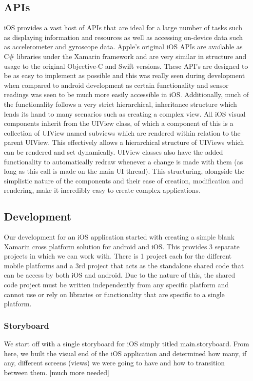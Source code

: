 \documentclass[main.tex]{subfiles}
\begin{document}
\subsection{APIs}
iOS provides a vast host of APIs that are ideal for a large number of tasks such as displaying information and resources as well as accessing on-device data such as accelerometer and gyroscope data. Apple’s original iOS APIs are available as C\# libraries under the Xamarin framework and are very similar in structure and usage to the original Objective-C and Swift versions. These API’s are designed to be as easy to implement as possible and this was really seen during development when compared to android development as certain functionality and sensor readings was seen to be much more easily accessible in iOS. Additionally, much of the functionality follows a very strict hierarchical, inheritance structure which lends its hand to many scenarios such as creating a complex view. All iOS visual components inherit from the UIView class, of which a component of this is a collection of UIView named subviews which are rendered within relation to the parent UIView. This effectively allows a hierarchical structure of UIViews which can be rendered and set dynamically. UIView classes also have the added functionality to automatically redraw whenever a change is made with them (as long as this call is made on the main UI thread). This structuring, alongside the simplistic nature of the components and their ease of creation, modification and rendering, make it incredibly easy to create complex applications.

\subsection{Development}

Our development for an iOS application started with creating a simple blank Xamarin cross platform solution for android and iOS. This provides 3 separate projects in which we can work with. There is 1 project each for the different mobile platforms and a 3rd project that acts as the standalone shared code that can be access by both iOS and android. Due to the nature of this, the shared code project must be written independently from any specific platform and cannot use or rely on libraries or functionality that are specific to a single platform.

\subsubsection{Storyboard}
We start off with a single storyboard for iOS simply titled main.storyboard. From here, we built the visual end of the iOS application and determined how many, if any, different screens (views) we were going to have and how to transition between them. [much more needed]
\end{document}
